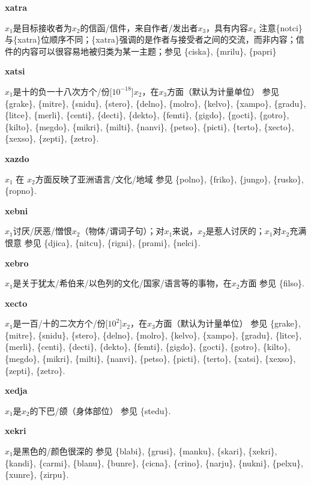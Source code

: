 \documentclass[notitlepage,twocolumn,a4paper,10pt]{book}
\begin{document}
{\sffamily\bfseries xatra}\enspace {\ttfamily\bfseries[        xa'a]}  $x_1$是目标接收者为$x_2$的信函\slash{}信件，来自作者\slash{}发出者$x_3$，具有内容$x_4$ \textemdash{} 注意\{notci\}与\{xatra\}位顺序不同；\{xatra\}强调的是作者与接受者之间的交流，而非内容；信件的内容可以很容易地被归类为某一主题；参见 \{ciska\}, \{mrilu\}, \{papri\}

{\sffamily\bfseries xatsi}\enspace {\ttfamily\bfseries[xat]}  $x_1$是十的负一十八次方个\slash{}份[$10^{-18}$]$x_2$，在$x_3$方面（默认为计量单位） \textemdash{} 参见 \{grake\}, \{mitre\}, \{snidu\}, \{stero\}, \{delno\}, \{molro\}, \{kelvo\}, \{xampo\}, \{gradu\}, \{litce\}, \{merli\}, \{centi\}, \{decti\}, \{dekto\}, \{femti\}, \{gigdo\}, \{gocti\}, \{gotro\}, \{kilto\}, \{megdo\}, \{mikri\}, \{milti\}, \{nanvi\}, \{petso\}, \{picti\}, \{terto\}, \{xecto\}, \{xexso\}, \{zepti\}, \{zetro\}.

{\sffamily\bfseries xazdo}  $x_{1}$ 在 $x_{2}$方面反映了亚洲语言\slash{}文化\slash{}地域 \textemdash{} 参见 \{polno\}, \{friko\}, \{jungo\}, \{rusko\}, \{ropno\}.

{\sffamily\bfseries xebni}  $x_1$讨厌\slash{}厌恶\slash{}憎恨$x_2$（物体\slash{}谓词子句）；对$x_1$来说，$x_2$是惹人讨厌的；$x_1$对$x_2$充满恨意 \textemdash{} 参见 \{djica\}, \{nitcu\}, \{rigni\}, \{prami\}, \{nelci\}.

{\sffamily\bfseries xebro}  $x_1$是关于犹太\slash{}希伯来\slash{}以色列的文化\slash{}国家\slash{}语言等的事物，在$x_2$方面 \textemdash{} 参见 \{filso\}.

{\sffamily\bfseries xecto}  $x_1$是一百\slash{}十的二次方个\slash{}份[$10^{2}$]$x_2$，在$x_3$方面（默认为计量单位） \textemdash{} 参见 \{grake\}, \{mitre\}, \{snidu\}, \{stero\}, \{delno\}, \{molro\}, \{kelvo\}, \{xampo\}, \{gradu\}, \{litce\}, \{merli\}, \{centi\}, \{decti\}, \{dekto\}, \{femti\}, \{gigdo\}, \{gocti\}, \{gotro\}, \{kilto\}, \{megdo\}, \{mikri\}, \{milti\}, \{nanvi\}, \{petso\}, \{picti\}, \{terto\}, \{xatsi\}, \{xexso\}, \{zepti\}, \{zetro\}.

{\sffamily\bfseries xedja}\enspace {\ttfamily\bfseries[xej     xe'a]}  $x_1$是$x_2$的下巴\slash{}颌（身体部位） \textemdash{} 参见 \{stedu\}.

{\sffamily\bfseries xekri}\enspace {\ttfamily\bfseries[xek     xe'i]}  $x_1$是黑色的\slash{}颜色很深的 \textemdash{} 参见 \{blabi\}, \{grusi\}, \{manku\}, \{skari\}, \{xekri\}, \{kandi\}, \{carmi\}, \{blanu\}, \{bunre\}, \{cicna\}, \{crino\}, \{narju\}, \{nukni\}, \{pelxu\}, \{xunre\}, \{zirpu\}.
\end{document}
